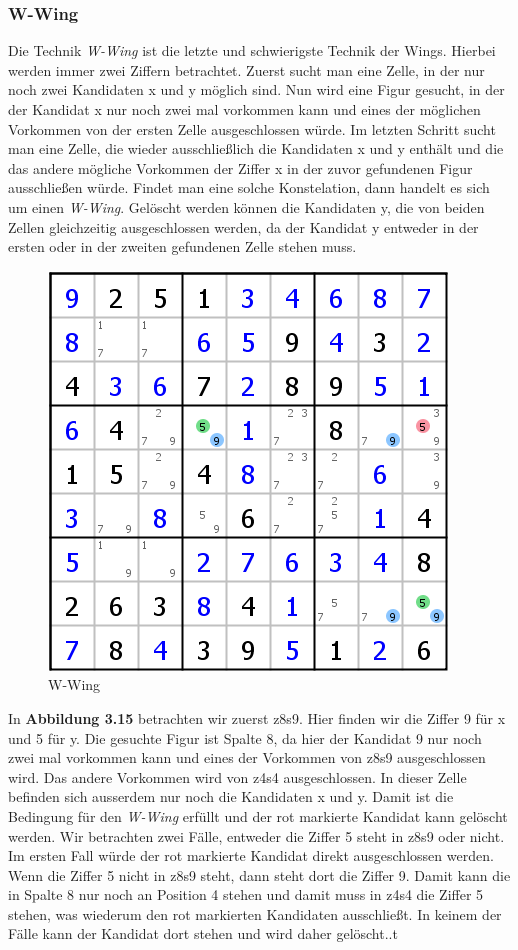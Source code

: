 \newpage
\subsubsection{W-Wing}
Die Technik \textit{W-Wing} ist die letzte und schwierigste Technik der Wings. Hierbei werden immer zwei Ziffern betrachtet. Zuerst sucht man eine Zelle, in der nur noch zwei Kandidaten x und y möglich sind. Nun wird eine Figur gesucht, in der der Kandidat x nur noch zwei mal vorkommen kann und eines der möglichen Vorkommen von der ersten Zelle ausgeschlossen würde. Im letzten Schritt sucht man eine Zelle, die wieder ausschließlich die Kandidaten x und y enthält und die das andere mögliche Vorkommen der Ziffer x in der zuvor gefundenen Figur ausschließen würde. Findet man eine solche Konstelation, dann handelt es sich um einen \textit{W-Wing}. Gelöscht werden können die  Kandidaten y, die von beiden Zellen gleichzeitig ausgeschlossen werden, da der Kandidat y entweder in der ersten oder in der zweiten gefundenen Zelle stehen muss.

\begin{figure}[h]
\begin{center}
\includegraphics{./img/W_Wing.png}
\caption{W-Wing}
\end{center}
\end{figure}

In \textbf{Abbildung 3.15} betrachten wir zuerst z8s9. Hier finden wir die Ziffer 9 für x und 5 für y. Die gesuchte Figur ist Spalte 8, da hier der Kandidat 9 nur noch zwei mal vorkommen kann und eines der Vorkommen von z8s9 ausgeschlossen wird.
Das andere Vorkommen wird von z4s4 ausgeschlossen. In dieser Zelle befinden sich ausserdem nur noch die Kandidaten x und y. Damit ist die Bedingung für den \textit{W-Wing} erfüllt und der rot markierte Kandidat kann gelöscht werden. Wir betrachten zwei Fälle, entweder die Ziffer 5 steht in z8s9 oder nicht. Im ersten Fall würde der rot markierte Kandidat direkt ausgeschlossen werden. Wenn die Ziffer 5 nicht in z8s9 steht, dann steht dort die Ziffer 9. Damit kann die in Spalte 8 nur noch an Position 4 stehen und damit muss in z4s4 die Ziffer 5 stehen, was wiederum den rot markierten Kandidaten ausschließt. In keinem der Fälle kann der Kandidat dort stehen und wird daher gelöscht..t